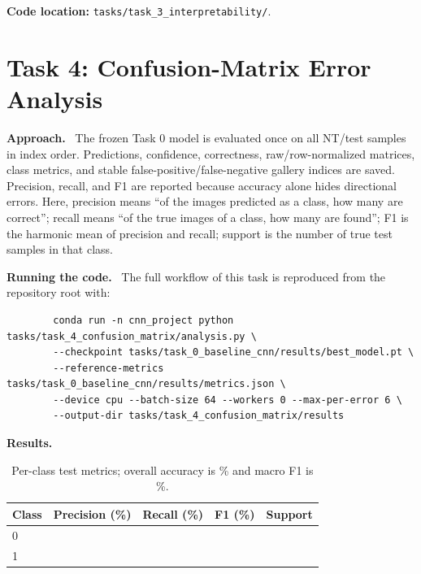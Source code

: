 \documentclass[10pt,a4paper]{article}
\newcommand{\TaskPage}[2]{%
  \clearpage
  \section{Task #1: #2}\label{task:#1:start}%
}
\newcommand{\TaskEnd}[1]{\label{task:#1:end}}
\newcommand{\RunHead}[1]{\par\smallskip\noindent\textbf{#1.}\ }
\newcommand{\CodePath}[1]{%
  \par\smallskip\noindent\textbf{Code location: }\nolinkurl{#1}.%
}
\begin{document}
\CodePath{tasks/task_3_interpretability/}
\TaskEnd{3}

\TaskPage{4}{Confusion-Matrix Error Analysis}

\RunHead{Approach}
The frozen Task 0 model is evaluated once on all \TaskZeroTestSize{} NT/test samples in index
order. Predictions, confidence, correctness, raw/row-normalized matrices, class metrics, and
stable false-positive/false-negative gallery indices are saved. Precision, recall, and F1 are
reported because accuracy alone hides directional errors.
Here, precision means ``of the images predicted as a class, how many are correct''; recall means
``of the true images of a class, how many are found''; F1 is the harmonic mean of precision and
recall; support is the number of true test samples in that class.


\RunHead{Running the code}
The full workflow of this task is reproduced from the repository root with:
\begin{small}
	\begin{verbatim}
		conda run -n cnn_project python tasks/task_4_confusion_matrix/analysis.py \
		--checkpoint tasks/task_0_baseline_cnn/results/best_model.pt \
		--reference-metrics tasks/task_0_baseline_cnn/results/metrics.json \
		--device cpu --batch-size 64 --workers 0 --max-per-error 6 \
		--output-dir tasks/task_4_confusion_matrix/results
	\end{verbatim}
\end{small}

\RunHead{Results}
\begin{table}[h]
\centering
\small
\caption{Per-class test metrics; overall accuracy is \TaskFourAccuracy\% and macro F1 is \TaskFourMacroFOne\%.}
\label{tab:t4-metrics}
\begin{tabular}{lrrrr}
\toprule
Class & Precision (\%) & Recall (\%) & F1 (\%) & Support \\
\midrule
0 & \TaskFourClassZeroPrecision & \TaskFourClassZeroRecall & \TaskFourClassZeroFOne & \TaskFourClassZeroSupport \\
1 & \TaskFourClassOnePrecision & \TaskFourClassOneRecall & \TaskFourClassOneFOne & \TaskFourClassOneSupport \\
\bottomrule
\end{tabular}
\end{table}

\vspace{1cm}
\end{document}
